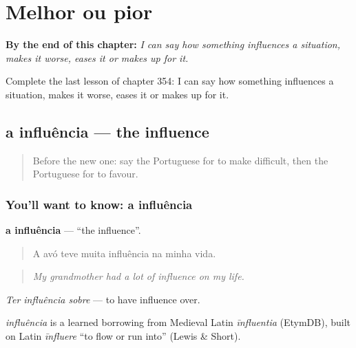 
\chapter{Melhor ou pior}
\label{ch:pt-melhor-ou-pior}

\begin{chapteropening}
\textbf{By the end of this chapter:} \emph{I can say how something influences a situation, makes it worse, eases it or makes up for it.}

Complete the last lesson of chapter 354: I can say how something influences a situation, makes it worse, eases it or makes up for it.
\end{chapteropening}

\section[a influência]{a influência — the influence}

\label{lesson:PT-C354-influencia}



\begin{quote}
Before the new one: say the Portuguese for to make difficult, then the Portuguese for to favour.
\end{quote}

\subsection*{You'll want to know: a influência}
\textbf{a influência} — \textquotedblleft{}the influence\textquotedblright{}.

\begin{quote}
A avó teve muita influência na minha vida.
\end{quote}

\begin{quote}
\emph{My grandmother had a lot of influence on my life.}
\end{quote}

\emph{Ter influência sobre} — to have influence over.

\begin{cousinweb}
\emph{influência} is a learned borrowing from Medieval Latin \emph{īnfluentia} (EtymDB), built on Latin \emph{īnfluere} \textquotedblleft{}to flow or run into\textquotedblright{} (Lewis \& Short).
\end{cousinweb}


